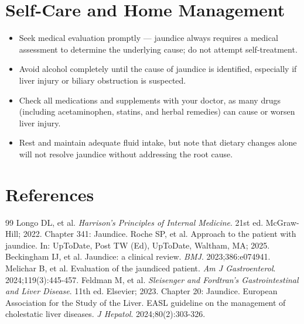 \section*{Self-Care and Home Management}
\begin{itemize}
  \item Seek medical evaluation promptly — jaundice always requires a medical assessment to determine the underlying cause; do not attempt self-treatment.
  \item Avoid alcohol completely until the cause of jaundice is identified, especially if liver injury or biliary obstruction is suspected.
  \item Check all medications and supplements with your doctor, as many drugs (including acetaminophen, statins, and herbal remedies) can cause or worsen liver injury.
  \item Rest and maintain adequate fluid intake, but note that dietary changes alone will not resolve jaundice without addressing the root cause.
\end{itemize}

\section*{References}

\begin{thebibliography}{99}
 Longo DL, et al. \emph{Harrison's Principles of Internal Medicine}. 21st ed. McGraw-Hill; 2022. Chapter 341: Jaundice.
 Roche SP, et al. Approach to the patient with jaundice. In: UpToDate, Post TW (Ed), UpToDate, Waltham, MA; 2025.
 Beckingham IJ, et al. Jaundice: a clinical review. \emph{BMJ}. 2023;386:e074941.
 Melichar B, et al. Evaluation of the jaundiced patient. \emph{Am J Gastroenterol}. 2024;119(3):445-457.
 Feldman M, et al. \emph{Sleisenger and Fordtran's Gastrointestinal and Liver Disease}. 11th ed. Elsevier; 2023. Chapter 20: Jaundice.
 European Association for the Study of the Liver. EASL guideline on the management of cholestatic liver diseases. \emph{J Hepatol}. 2024;80(2):303-326.
\end{thebibliography}
